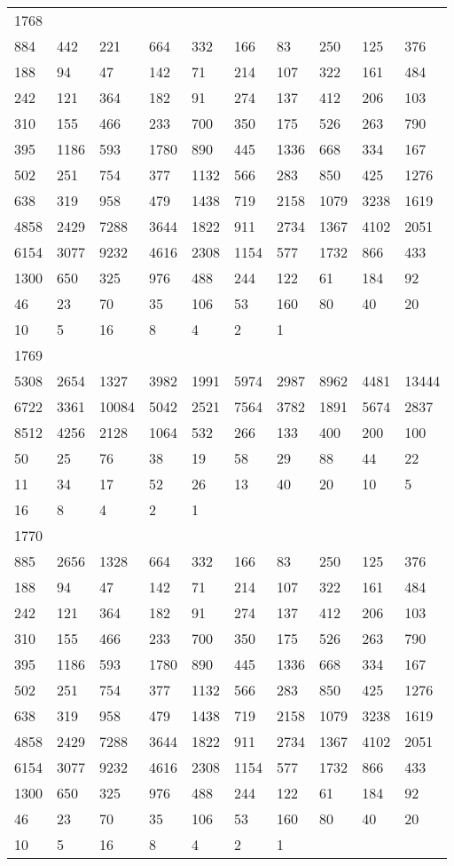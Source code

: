 \begin{longtable}{*{10}{l}}
1768&&&&&&&&&\\
884& 442& 221& 664& 332& 166& 83& 250& 125& 376\\
188& 94& 47& 142& 71& 214& 107& 322& 161& 484\\
242& 121& 364& 182& 91& 274& 137& 412& 206& 103\\
310& 155& 466& 233& 700& 350& 175& 526& 263& 790\\
395& 1186& 593& 1780& 890& 445& 1336& 668& 334& 167\\
502& 251& 754& 377& 1132& 566& 283& 850& 425& 1276\\
638& 319& 958& 479& 1438& 719& 2158& 1079& 3238& 1619\\
4858& 2429& 7288& 3644& 1822& 911& 2734& 1367& 4102& 2051\\
6154& 3077& 9232& 4616& 2308& 1154& 577& 1732& 866& 433\\
1300& 650& 325& 976& 488& 244& 122& 61& 184& 92\\
46& 23& 70& 35& 106& 53& 160& 80& 40& 20\\
10& 5& 16& 8& 4& 2& 1& \\

1769&&&&&&&&&\\
5308& 2654& 1327& 3982& 1991& 5974& 2987& 8962& 4481& 13444\\
6722& 3361& 10084& 5042& 2521& 7564& 3782& 1891& 5674& 2837\\
8512& 4256& 2128& 1064& 532& 266& 133& 400& 200& 100\\
50& 25& 76& 38& 19& 58& 29& 88& 44& 22\\
11& 34& 17& 52& 26& 13& 40& 20& 10& 5\\
16& 8& 4& 2& 1& \\

1770&&&&&&&&&\\
885& 2656& 1328& 664& 332& 166& 83& 250& 125& 376\\
188& 94& 47& 142& 71& 214& 107& 322& 161& 484\\
242& 121& 364& 182& 91& 274& 137& 412& 206& 103\\
310& 155& 466& 233& 700& 350& 175& 526& 263& 790\\
395& 1186& 593& 1780& 890& 445& 1336& 668& 334& 167\\
502& 251& 754& 377& 1132& 566& 283& 850& 425& 1276\\
638& 319& 958& 479& 1438& 719& 2158& 1079& 3238& 1619\\
4858& 2429& 7288& 3644& 1822& 911& 2734& 1367& 4102& 2051\\
6154& 3077& 9232& 4616& 2308& 1154& 577& 1732& 866& 433\\
1300& 650& 325& 976& 488& 244& 122& 61& 184& 92\\
46& 23& 70& 35& 106& 53& 160& 80& 40& 20\\
10& 5& 16& 8& 4& 2& 1& \\


\end{longtable}
